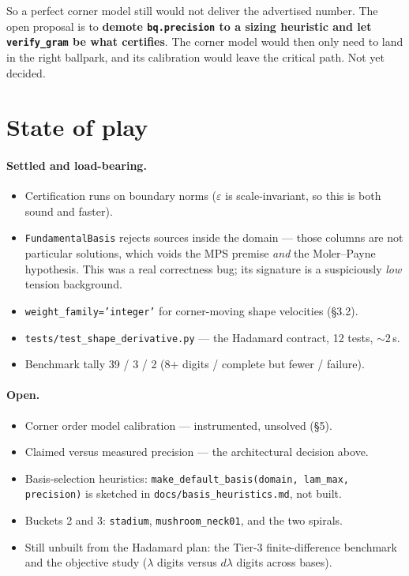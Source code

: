 \documentclass[11pt]{article}
\newcommand{\code}[1]{\texttt{#1}}
\begin{document}
\noindent
So a perfect corner model still would not deliver the advertised number. The open
proposal is to \textbf{demote \code{bq.precision} to a sizing heuristic and let
\code{verify\_gram} be what certifies}. The corner model would then only need to
land in the right ballpark, and its calibration would leave the critical path.
Not yet decided.

\section{State of play}

\paragraph{Settled and load-bearing.}
\begin{itemize}
\item Certification runs on boundary norms ($\varepsilon$ is scale-invariant, so
  this is both sound and faster).
\item \code{FundamentalBasis} rejects sources inside the domain --- those columns
  are not particular solutions, which voids the MPS premise \emph{and} the
  Moler--Payne hypothesis. This was a real correctness bug; its signature is a
  suspiciously \emph{low} tension background.
\item \code{weight\_family='integer'} for corner-moving shape velocities (\S3.2).
\item \code{tests/test\_shape\_derivative.py} --- the Hadamard contract, 12
  tests, ${\sim}2$\,s.
\item Benchmark tally 39 / 3 / 2 (8+ digits / complete but fewer / failure).
\end{itemize}

\paragraph{Open.}
\begin{itemize}
\item Corner order model calibration --- instrumented, unsolved (\S5).
\item Claimed versus measured precision --- the architectural decision above.
\item Basis-selection heuristics:
  \code{make\_default\_basis(domain, lam\_max, precision)} is sketched in
  \code{docs/basis\_heuristics.md}, not built.
\item Buckets 2 and 3: \code{stadium}, \code{mushroom\_neck01}, and the two
  spirals.
\item Still unbuilt from the Hadamard plan: the Tier-3 finite-difference
  benchmark and the objective study ($\lambda$ digits versus $d\lambda$ digits
  across bases).
\end{itemize}
\end{document}
